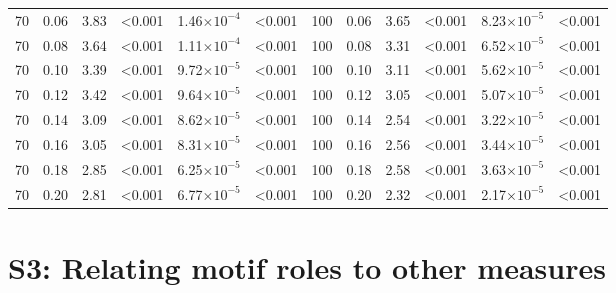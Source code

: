 \documentclass[12pt]{article}
\begin{document}
\begin{table}[h!]
\begin{tabular}{c c | c c| c c ||c c | c c | c c |}
        70	&	0.06	&	3.83	&	\textless0.001	&	1.46$\times10^{-4}$	&	\textless0.001	&	100	&	0.06	&	3.65	&	\textless0.001	&	8.23$\times10^{-5}$	&	\textless0.001	\\
        70	&	0.08	&	3.64	&	\textless0.001	&	1.11$\times10^{-4}$	&	\textless0.001	&	100	&	0.08	&	3.31	&	\textless0.001	&	6.52$\times10^{-5}$	&	\textless0.001	\\
        70	&	0.10	&	3.39	&	\textless0.001	&	9.72$\times10^{-5}$	&	\textless0.001	&	100	&	0.10	&	3.11	&	\textless0.001	&	5.62$\times10^{-5}$	&	\textless0.001	\\
        70	&	0.12	&	3.42	&	\textless0.001	&	9.64$\times10^{-5}$	&	\textless0.001	&	100	&	0.12	&	3.05	&	\textless0.001	&	5.07$\times10^{-5}$	&	\textless0.001	\\
        70	&	0.14	&	3.09	&	\textless0.001	&	8.62$\times10^{-5}$	&	\textless0.001	&	100	&	0.14	&	2.54	&	\textless0.001	&	3.22$\times10^{-5}$	&	\textless0.001	\\
        70	&	0.16	&	3.05	&	\textless0.001	&	8.31$\times10^{-5}$	&	\textless0.001	&	100	&	0.16	&	2.56	&	\textless0.001	&	3.44$\times10^{-5}$	&	\textless0.001	\\
        70	&	0.18	&	2.85	&	\textless0.001	&	6.25$\times10^{-5}$	&	\textless0.001	&	100	&	0.18	&	2.58	&	\textless0.001	&	3.63$\times10^{-5}$	&	\textless0.001	\\
        70	&	0.20	&	2.81	&	\textless0.001	&	6.77$\times10^{-5}$	&	\textless0.001	&	100	&	0.20	&	2.32	&	\textless0.001	&	2.17$\times10^{-5}$	&	\textless0.001	\\

    \end{tabular}
    \end{table}
    

\clearpage

\section*{S3: Relating motif roles to other measures}
\end{document}
